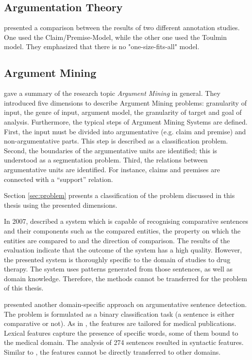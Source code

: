 \subsection{Argumentation Theory}

\cite{Habernal2014Argumentation-M} presented a comparison between the results of two different annotation studies. One used the Claim/Premise-Model, while the other one used the Toulmin model. They emphasized that there is no "one-size-fits-all" model.

\label{sec:argth}
\subsection{Argument Mining}
\label{sec:argmine}
\cite{Lippi2016Argumentation-M} gave a summary of the research topic \emph{Argument Mining} in general. They introduced five dimensions to describe Argument Mining problems: granularity of input, the genre of input, argument model, the granularity of target and goal of analysis.  Furthermore, the typical steps of Argument Mining Systems are defined. First, the input must be divided into argumentative (e.g. claim and premise) and non-argumentative parts. This step is described as a classification problem. Second, the boundaries of the argumentative units are identified; this is understood as a segmentation problem. Third, the relations between argumentative units are identified. For instance, claims and premises are connected with a \enquote{support} relation.

Section \ref{sec:problem} presents a classification of the problem discussed in this thesis using the presented dimensions.\newline

In 2007, \cite{fiszman2007interpreting} described a system which is capable of recognising comparative sentences and their components such as the compared entities, the property on which the entities are compared to and the direction of comparison. The results of the evaluation indicate that the outcome of the system has a high quality. However, the presented system is thoroughly specific to the domain of studies to drug therapy. The system uses patterns generated from those sentences, as well as domain knowledge. Therefore, the methods cannot be transferred for the problem of this thesis.

\cite{park2012identifying} presented another domain-specific approach on argumentative sentence detection. The problem is formulated as a binary classification task (a sentence is either comparative or not). As in \cite{fiszman2007interpreting}, the features are tailored for medical publications. Lexical features capture the presence of specific words, some of them bound to the medical domain. The analysis of 274 sentences resulted in syntactic features. Similar to \cite{fiszman2007interpreting}, the features cannot be directly transferred to other domains.

